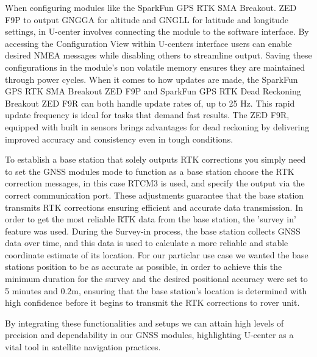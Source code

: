 \documentclass{article}
\begin{document}
When configuring modules like the SparkFun GPS RTK SMA Breakout. ZED F9P to
output GNGGA for altitude and GNGLL for latitude and longitude settings, in
U-center involves connecting the module to the software interface. By accessing
the Configuration View within U-centers interface users can enable desired NMEA
messages while disabling others to streamline output. Saving these
configurations in the module's non volatile memory ensures they are maintained
through power cycles. When it comes to how updates are made, the SparkFun GPS
RTK SMA Breakout ZED F9P and SparkFun GPS RTK Dead Reckoning Breakout ZED F9R
can both handle update rates of, up to 25 Hz. This rapid update frequency is
ideal for tasks that demand fast results. The ZED F9R, equipped with built in
sensors brings advantages for dead reckoning by delivering improved accuracy and
consistency even in tough conditions.

To establish a base station that solely outputs RTK corrections you simply need
to set the GNSS modules mode to function as a base station choose the RTK
correction messages, in this case RTCM3 is used, and specify the output via the
correct communication port. These adjustments guarantee that the base station
transmits RTK corrections ensuring efficient and accurate data transmission. In
order to get the most reliable RTK data from the base station, the 'survey in'
feature was used. During the Survey-in process, the base station collects GNSS
data over time, and this data is used to calculate a more reliable and stable
coordinate estimate of its location. For our particlar use case we wanted the
base stations position to be as accurate as possible, in order to achieve this
the minimum duration for the survey and the desired positional accuracy were set
to 5 minutes and 0.2m, ensuring that the base station's location is determined
with high confidence before it begins to transmit the  RTK corrections to rover
unit.

By integrating these functionalities and setups we can attain high levels of
precision and dependability in our GNSS modules, highlighting U-center as a
vital tool in satellite navigation practices.
\end{document}
